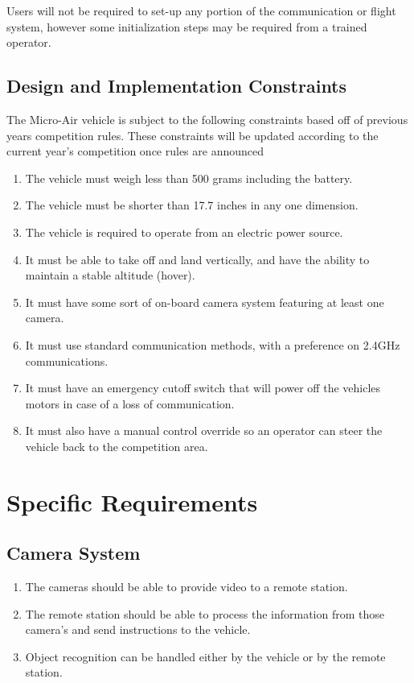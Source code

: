 \documentclass[onecolumn, draftclsnofoot,10pt, compsoc]{IEEEtran}
\begin{document}
Users will not be required to set-up any portion of the communication or flight system, however some initialization steps may be required from a trained operator. 


\subsection{Design and Implementation Constraints}

The Micro-Air vehicle is subject to the following constraints based off of previous years competition rules.\cite{r2} These constraints will be updated according to the current year’s competition once rules are announced
\begin{enumerate}
\item The vehicle must weigh less than 500 grams including the battery.
\item The vehicle must be shorter than 17.7 inches in any one dimension. 
\item The vehicle is required to operate from an electric power source.
\item It must be able to take off and land vertically, and have the ability to maintain a stable altitude (hover).
\item It must have some sort of on-board camera system featuring at least one camera.
\item It must use standard communication methods, with a preference on 2.4GHz communications.
\item It must have an emergency cutoff switch that will power off the vehicles motors in case of a loss of communication.
\item It must also have a manual control override so an operator can steer the vehicle back to the competition area. 
\end{enumerate}








\section{Specific Requirements}
\subsection{Camera System}
\begin{enumerate}
\item The cameras should be able to provide video to a remote station. 

\item The remote station should be able to process the information from those camera’s and send instructions to the vehicle. 

\item Object recognition can be handled either by the vehicle or by the remote station.

\end{enumerate}
\end{document}
